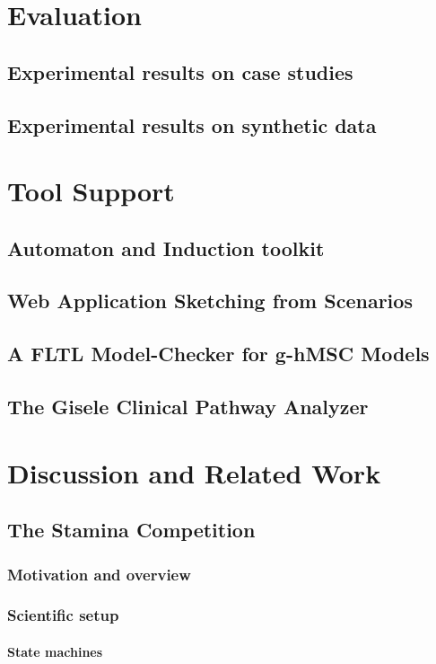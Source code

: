 \documentclass[dvips,a4paper,11pt]{report}
\begin{document}
\chapter{Evaluation}
  \section{Experimental results on case studies}
  \section{Experimental results on synthetic data}
\chapter{Tool Support}
  \section{Automaton and Induction toolkit}
  \section{Web Application Sketching from Scenarios}
  \section{A FLTL Model-Checker for g-hMSC Models}
  \section{The Gisele Clinical Pathway Analyzer}
\chapter{Discussion and Related Work}
  \section{The Stamina Competition\label{section_stamina}}
    \subsection{Motivation and overview\label{subsection_stamina_overview}}
    \subsection{Scientific setup\label{subsection_stamina_setup}}
      \subsubsection*{State machines}
\end{document}
